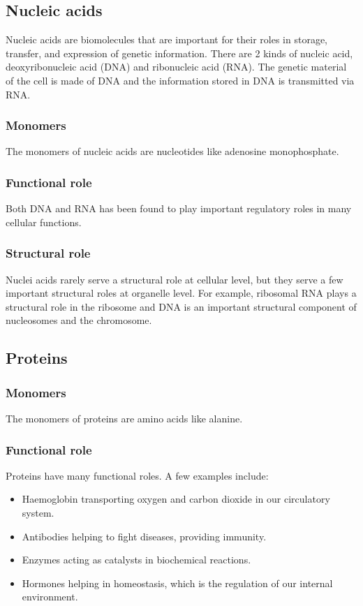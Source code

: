 \documentclass[11pt]{article}
\begin{document}
\subsection{Nucleic acids}
\label{sec:org290c1ac}
Nucleic acids are biomolecules that are important for their roles in storage, transfer, and expression of genetic information. There are 2 kinds of nucleic acid, deoxyribonucleic acid (DNA) and ribonucleic acid (RNA). The genetic material of the cell is made of DNA and the information stored in DNA is transmitted via RNA.
\subsubsection{Monomers}
\label{sec:orgfb6c7a7}
The monomers of nucleic acids are nucleotides like adenosine monophosphate.
\subsubsection{Functional role}
\label{sec:org2bbe08e}
Both DNA and RNA has been found to play important regulatory roles in many cellular functions.
\subsubsection{Structural role}
\label{sec:orgaf16050}
Nuclei acids rarely serve a structural role at cellular level, but they serve a few important structural roles at organelle level. For example, ribosomal RNA plays a structural role in the ribosome and DNA is an important structural component of nucleosomes and the chromosome.
\subsection{Proteins}
\label{sec:org5acaf8b}

\subsubsection{Monomers}
\label{sec:org8b8dbee}
The monomers of proteins are amino acids like alanine.
\subsubsection{Functional role}
\label{sec:orgb19ee57}
Proteins have many functional roles. A few examples include:
\begin{itemize}
\item Haemoglobin transporting oxygen and carbon dioxide in our circulatory system.
\item Antibodies helping to fight diseases, providing immunity.
\item Enzymes acting as catalysts in biochemical reactions.
\item Hormones helping in homeostasis, which is the regulation of our internal environment.
\end{itemize}
\end{document}
